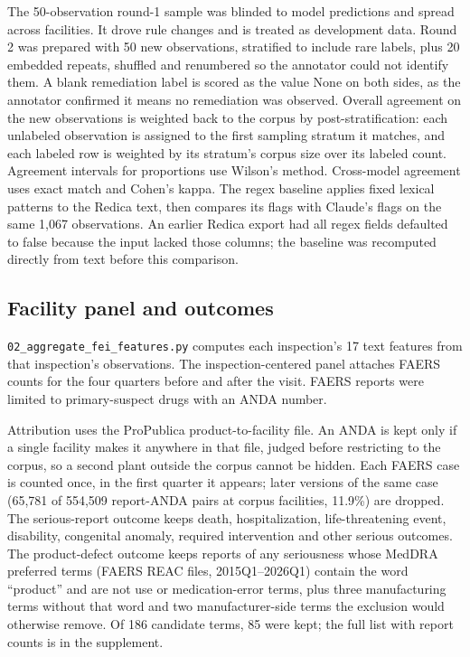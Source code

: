 \documentclass[12pt]{article}
\begin{document}
The 50-observation round-1 sample was blinded to model predictions and
spread across facilities. It drove rule changes and is treated as
development data. Round 2 was prepared with 50 new observations,
stratified to include rare labels, plus 20 embedded repeats, shuffled and
renumbered so the annotator could not identify them. A blank remediation
label is scored as the value None on both sides, as the annotator
confirmed it means no remediation was observed. Overall agreement on the
new observations is weighted back to the corpus by post-stratification:
each unlabeled observation is assigned to the first sampling stratum it
matches, and each labeled row is weighted by its stratum's corpus size
over its labeled count. Agreement intervals
for proportions use Wilson's method. Cross-model agreement uses exact
match and Cohen's kappa. The regex baseline applies fixed lexical
patterns to the Redica text, then compares its flags with Claude's
flags on the same 1,067 observations. An earlier Redica export had all
regex fields defaulted to false because the input lacked those columns;
the baseline was recomputed directly from text before this comparison.

\subsection{Facility panel and outcomes}

\texttt{02\_aggregate\_fei\_features.py} computes each inspection's 17 text
features from that inspection's observations. The inspection-centered panel
attaches FAERS counts for the four quarters before and after the visit.
FAERS reports were limited to primary-suspect drugs with an ANDA number.

Attribution uses the ProPublica product-to-facility file. An ANDA is kept
only if a single facility makes it anywhere in that file, judged before
restricting to the corpus, so a second plant outside the corpus cannot be
hidden. Each FAERS case is counted once, in the first quarter it appears;
later versions of the same case (65,781 of 554,509 report-ANDA pairs at
corpus facilities, 11.9\%) are dropped. The serious-report outcome keeps
death, hospitalization, life-threatening event, disability, congenital
anomaly, required intervention and other serious outcomes. The
product-defect outcome keeps reports of any seriousness whose MedDRA
preferred terms (FAERS REAC files, 2015Q1--2026Q1) contain the word
``product'' and are not use or medication-error terms, plus three
manufacturing terms without that word and two manufacturer-side terms the
exclusion would otherwise remove. Of 186 candidate terms, 85 were kept;
the full list with report counts is in the supplement.
\end{document}

